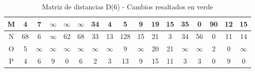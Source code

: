 \documentclass[12pt]{article}
\begin{document}
\begin{table}[h!]
\begin{tabular}{|c|c|c|c|c|c|c|c|c|c|c|c|c|c|c|c|c|}
M & 4 & 7 & $\infty$ & $\infty$ & $\infty$ & 34 & 4 & 5 & 9 & 19 & 15 & \cellcolor{lightgreen} 35 & 0 & \cellcolor{lightgreen} 90 & 12 & 15 \\\hline
N & 68 & 6 & $\infty$ & 62 & 68 & 33 & 13 & 128 & 15 & 21 & 3 & \cellcolor{lightgreen} 34 & \cellcolor{lightgreen} 56 & 0 & 11 & 14 \\\hline
O & 5 & $\infty$ & $\infty$ & $\infty$ & $\infty$ & $\infty$ & $\infty$ & 9 & $\infty$ & 20 & 21 & $\infty$ & $\infty$ & 2 & 0 & $\infty$ \\\hline
P & 4 & 6 & 9 & 0 & 6 & 2 & 3 & 13 & 9 & 15 & 11 & \cellcolor{lightgreen} 3 & 3 & 0 & 9 & 0 \\\hline
\end{tabular}
\caption{Matriz de distancias D(6) - Cambios resaltados en verde}
\end{table}
\end{document}
